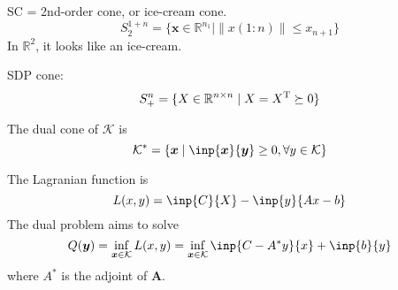SC = 2nd-order cone, or ice-cream cone.
\[
S_2^{1+n}=\{\bm x\in\mathbb{R}^{n_1}\mid\|x(1:n)\|\le x_{n+1}\}
\]
In $\mathbb{R}^2$, it looks like an ice-cream.

SDP cone:
\[
S_+^n=\{X\in\mathbb{R}^{n\times n}\mid X=X^{\mathrm T}\succeq0\}
\]

The dual cone of $\mathcal{K}$ is
\[
\mathcal{K}^*=\{\bm x\mid \inp{\bm x}{\bm y}\ge0,\forall y\in\mathcal{K}\}
\]

The Lagranian function is
\[
L(x,y)=\inp{C}{X}-\inp{y}{Ax-b}
\]
The dual problem aims to solve
\[
Q(\bm y)=\inf_{\bm x\in\mathcal{K}}L(x,y)
=
\inf_{\bm x\in\mathcal{K}}\inp{C-A^*y}{x}+\inp{b}{y}
\]
where $A^*$ is the adjoint of $\bm A$.
























